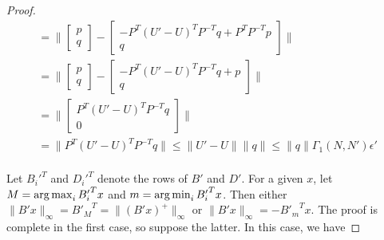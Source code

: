 \begin{proof}
\begin{align*}
= \bigg\|\begin{bmatrix}{ p} \\ { q}\end{bmatrix} - \begin{bmatrix}{-P^T(U' - U)^T P^{-T}q +P^T P^{-T}p} \\ {q}\end{bmatrix} \bigg\| \\
= \bigg\|\begin{bmatrix}{ p} \\ { q}\end{bmatrix} - \begin{bmatrix}{-P^T(U' - U)^T P^{-T}q + p} \\ {q}\end{bmatrix} \bigg\| \\
= \bigg\|\begin{bmatrix}{P^T(U' - U)^T P^{-T}q} \\ 0 \end{bmatrix} \bigg\| \\
= \bigg\|P^T(U' - U)^T P^{-T}q \bigg\| \le \|U' - U\|\|q\| \le \|q\|\Gamma_1(N, N')\epsilon'\\
\end{align*}

Let ${B_i'}^T$ and ${D_i'}^T$ denote the rows of $B'$ and $D'$.
For a given $x$, let $M = \operatorname*{arg\,max}_{i}{B'_i}^Tx$ and $m = \operatorname*{arg\,min}_{i}{B'_i}^Tx$.
Then either $\|B'x\|_{\infty} = {B'_M}^T = \|(B'x)^+\|_{\infty}$ or $\|B'x\|_{\infty} = -{B'_m}^Tx$.
The proof is complete in the first case, so suppose the latter.
In this case, we have 


\end{proof}
